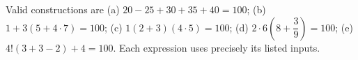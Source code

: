 Valid constructions are (a) $20-25+30+35+40=100$; (b) $1+3(5+4\cdot7)=100$; (c) $1(2+3)(4\cdot5)=100$; (d) $2\cdot6(8+\dfrac{3}{9})=100$; (e) $4!(3+3-2)+4=100$. Each expression uses precisely its listed inputs.
